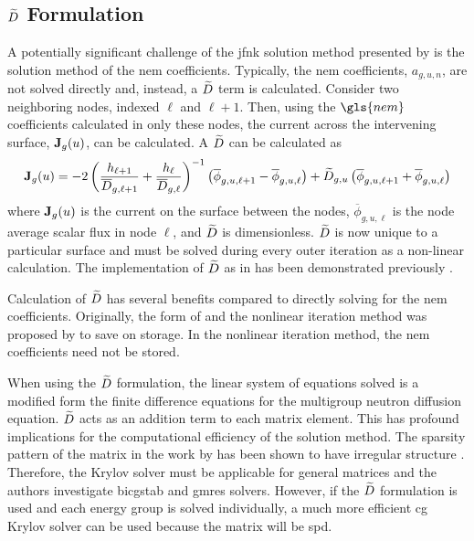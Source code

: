   \subsection{\texorpdfstring{$\widetilde{D}$ Formulation}{D\textasciitilde \ Formulation}}
    \label{sec:dtilde_formulation}

    A potentially significant challenge of the \gls{jfnk} solution method
    presented by \citeauthor{qe2paper} is the solution method of the \gls{nem}
    coefficients. Typically, the \gls{nem} coefficients, $a_{g,u,n}$, are not
    solved directly and, instead, a $\widetilde{D}$ term is calculated. Consider two
    neighboring nodes, indexed $\ell$ and $\ell+1$. Then, using the $\gls{nem}$
    coefficients calculated in only these nodes, the current across the
    intervening surface, $\mathbf{J}_g(u)$, can be calculated. A $\widetilde{D}$ can be
    calculated as
    \begin{equation}
      \label{eq:dtilde}
      \mathbf{J}_g(u) = 
        -2 \left( \frac{h_{\ell+1}}{\overline{D}_{g,\ell+1}} + 
          \frac{h_{\ell}}{\overline{D}_{g,\ell}} \right)^{-1}
          \left( \overline{\phi}_{g,u,\ell+1} -
          \overline{\phi}_{g,u,\ell} \right) + 
        \widetilde{D}_{g,u} \left( \overline{\phi}_{g,u,\ell+1} +
          \overline{\phi}_{g,u,\ell} \right)
    \end{equation}
    where $\mathbf{J}_g(u)$ is the current on the surface between the nodes,
    $\overline{\phi}_{g,u,\ell}$ is the node average scalar flux in node $\ell$,
    and $\widetilde{D}$ is dimensionless. $\widetilde{D}$ is now unique to a particular
    surface and must be solved during every outer iteration as a non-linear
    calculation. The implementation of $\widetilde{D}$ as in  has been
    demonstrated previously \cite{smith_nonlinear,palmtagThesis}.

    Calculation of $\widetilde{D}$ has several benefits compared to directly solving
    for the \gls{nem} coefficients. Originally, the form of  and
    the nonlinear iteration method was proposed by \citeauthor{smith_nonlinear}
    to save on storage. In the nonlinear iteration method, the \gls{nem}
    coefficients need not be stored.

    When using the $\widetilde{D}$ formulation, the linear system of equations solved
    is a modified form the finite difference equations for the multigroup
    neutron diffusion equation. $\widetilde{D}$ acts as an addition term to each
    matrix element. This has profound implications for the computational
    efficiency of the solution method. The sparsity pattern of the matrix in the
    work by \citeauthor{qe2paper} has been shown to have irregular structure
    \cite{palmtagThesis}. Therefore, the Krylov solver must be applicable for
    general matrices and the authors investigate \gls{bicgstab} and \gls{gmres}
    solvers. However, if the $\widetilde{D}$ formulation is used and each energy group
    is solved individually, a much more efficient \gls{cg} Krylov solver can be
    used because the matrix will be \gls{spd}. 


